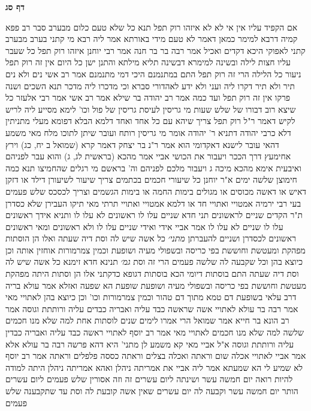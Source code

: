 \documentclass[12pt, openany]{book}
\newcommand{\sethebfont}{
\fontsize{10.5pt}{21.0pt} \selectfont
}
\newcommand{\twocol}[1]{
	{\sethebfont \begin{multicols}{2}
			#1
	\end{multicols}}	
}
\newcommand{\sectname}{}
\newcommand{\newsection}[1]{
	\addcontentsline{toc}{section}{#1}
	\renewcommand{\sectname}{#1}	
	\vspace{-\baselineskip}
	\begin{center}
		\textbf{%
\fontsize{16pt}{16pt}\selectfont
			#1}
	\end{center}
	\vspace{-\baselineskip}
	\nopagebreak
}
\begin{document}
\newsection{דף סג}
\twocol{אם הקפיד עליו אין אי לא לא
איזהו רוק תפל תנא  כל שלא טעם כלום מבערב  סבר רב פפא קמיה דרבא למימר  כמאן דאמר לא טעם מידי באורתא  אמר ליה רבא  מי קתני בערב מבערב קתני לאפוקי היכא דקדים ואכיל 
אמר רבה בר בר חנה אמר רבי יוחנן  איזהו רוק תפל כל שעבר עליו חצות לילה ובשינה  למימרא דבשינה תליא מילתא  והתנן  ישן כל היום אין זה רוק תפל ניעור כל הלילה הרי זה רוק תפל  התם במתנמנם 
היכי דמי מתנמנם  אמר רב אשי  נים ולא נים תיר ולא תיר דקרו ליה ועני ולא ידע לאהדורי סברא וכי מדכרו ליה מדכר 
תנא  השכים ושנה פרקו אין זה רוק תפל  ועד כמה  אמר רב יהודה בר שילא אמר רב אשי אמר רבי אלעזר  כל שיצא רוב דבורו של שלש שעות
מי גריסין לעיסת גריסין של פול וכו' לימא מסייע ליה לריש לקיש דאמר ר"ל  רוק תפל צריך שיהא עם כל אחד ואחד  דלמא הבלא דפומא מעלי 
מתניתין דלא כרבי יהודה דתניא ר' יהודה אומר  מי גריסין רותח ועובר שיתן לתוכו מלח 
מאי משמע דהאי עובר לישנא דאקדומי הוא  אמר ר"נ בר יצחק  דאמר קרא (שמואל ב יח, כג) וירץ אחימעץ דרך הככר ויעבור את הכושי  אביי אמר  מהכא (בראשית לג, ג) והוא עבר לפניהם  ואיבעית אימא מהכא  {מיכה ג } ויעבור מלכם לפניהם וה' בראשם
מי רגלים שהחמיצו תנא  כמה חימוצן  שלשה ימים 
א"ר יוחנן  כל שיעורי חכמים בכתמים צריך שיעור לשיעורן  דילד או דזקן  דאיש או דאשה  מכוסים או מגולים  בימות החמה או בימות הגשמים
וצריך לכסכס שלש פעמים בעי רבי ירמיה  אמטויי ואתויי חד או דלמא אמטויי ואתויי תרתי מאי  תיקו
העבירן שלא כסדרן ת"ר  הקדים שניים לראשונים  תני חדא  שניים עלו לו ראשונים לא עלו לו  ותניא אידך  ראשונים עלו לו שניים לא עלו לו 
אמר אביי  אידי ואידי שניים עלו לו ולא ראשונים  ומאי ראשונים ראשונים לכסדרן ושניים להעברתן
{\large\emph{מתני׳}} כל אשה שיש לה וסת דיה שעתה ואלו הן הוסתות  מפהקת ומעטשת וחוששת בפי כריסה ובשפולי מעיה ושופעת וכמין צמרמורות אוחזין אותה וכן כיוצא בהן  וכל שקבעה לה שלשה פעמים הרי זה וסת
{\large\emph{גמ׳}} תנינא חדא זימנא כל אשה שיש לה וסת דיה שעתה  התם בוסתות דיומי הכא בוסתות דגופא 
כדקתני  אלו הן וסתות היתה מפהקת מעטשת וחוששת בפי כריסה ובשפולי מעיה ושופעת 
שופעת  הא שפעה ואזלא  אמר עולא בריה דרב עלאי
בשופעת דם טמא מתוך דם טהור 
וכמין צמרמורות וכו' וכן כיוצא בהן לאתויי מאי  אמר רבה בר עולא  לאתויי אשה שראשה כבד עליה ואבריה כבדים עליה ורותתת וגוסה 
אמר רב הונא בר חייא אמר שמואל  הרי אמרו לימים שנים לוסתות אחת למה שלא מנו חכמים שלשה 
למה שלא מנו חכמים לאתויי מאי  אמר רב יוסף  לאתויי ראשה כבד עליה ואבריה כבדין עליה ורותתת וגוסה  א"ל אביי  מאי קא משמע לן  מתני' היא דהא פרשה רבה בר עולא  אלא אמר אביי  לאתויי אכלה שום וראתה ואכלה בצלים וראתה כססה פלפלים וראתה 
אמר רב יוסף  לא שמיע לי הא שמעתא 
אמר ליה אביי  את אמריתה ניהלן ואהא אמריתה ניהלן  היתה למודה להיות רואה יום חמשה עשר ושינתה ליום עשרים זה וזה אסורין  שלש פעמים ליום עשרים הותר יום חמשה עשר וקבעה לה יום עשרים שאין אשה קובעת לה וסת עד שתקבענה שלש פעמים 
}
\end{document}

